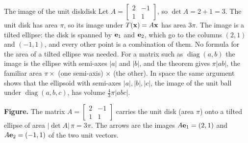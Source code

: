 \documentclass[11pt]{article}
\begin{document}
\begin{exmp}{The image of the unit disk}{disk}
Let $A=\begin{bmatrix}2&-1\\1&1\end{bmatrix}$, so $\det A=2+1=3$. The unit disk has area $\pi$, so its image under $T(\mathbf{x})=A\mathbf{x}$ has area $3\pi$. The image is a tilted ellipse: the disk is spanned by $\mathbf{e}_1$ and $\mathbf{e}_2$, which go to the columns $(2,1)$ and $(-1,1)$, and every other point is a combination of them. No formula for the area of a tilted ellipse was needed. For a matrix such as $\operatorname{diag}(a,b)$ the image is the ellipse with semi-axes $|a|$ and $|b|$, and the theorem gives $\pi|ab|$, the familiar area $\pi\times$ (one semi-axis) $\times$ (the other). In space the same argument shows that the ellipsoid with semi-axes $|a|,|b|,|c|$, the image of the unit ball under $\operatorname{diag}(a,b,c)$, has volume $\frac43\pi|abc|$.
\end{exmp}

\begin{center}
\end{center}

\textbf{Figure.} The matrix $A=\begin{bmatrix}2&-1\\1&1\end{bmatrix}$ carries the unit disk (area $\pi$) onto a tilted ellipse of area $|\det A|\,\pi=3\pi$. The arrows are the images $A\mathbf{e}_1=(2,1)$ and $A\mathbf{e}_2=(-1,1)$ of the two unit vectors.
\end{document}
